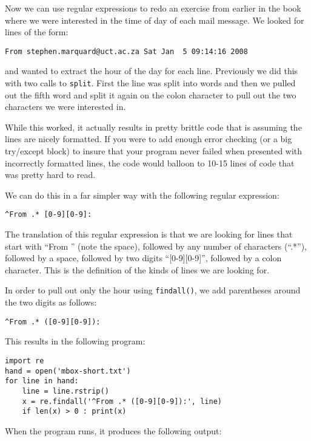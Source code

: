 Now we can use regular expressions to redo an exercise from earlier in the book where we were
interested in the time of day of each mail message.   We looked for lines of the form:

\beforeverb
\begin{verbatim}
From stephen.marquard@uct.ac.za Sat Jan  5 09:14:16 2008
\end{verbatim}
\afterverb
%
and wanted to extract the hour of the day for each line.  Previously we did this with two calls
to {\tt split}.  First the line was split into words and then we pulled out the fifth word and split
it again on the colon character to pull out the two characters we were interested in.

While this worked, it actually results in pretty brittle code that is assuming the lines are nicely
formatted.  If you were to add enough error checking (or a big try/except block) to insure that your
program never failed when presented with incorrectly formatted lines, the code would balloon to 
10-15 lines of code that was pretty hard to read.

We can do this in a far simpler way with the following regular expression:

\beforeverb
\begin{verbatim}
^From .* [0-9][0-9]:
\end{verbatim}
\afterverb
%
The translation of this regular expression is that we are looking for lines that start with ``From ''
(note the space), followed by any number of characters (``.*''), followed by a space, followed by two
digits ``[0-9][0-9]'', followed by a colon character.  This is the definition of the kinds of lines
we are looking for.  

In order to pull out only the hour using {\tt findall()}, we add parentheses around the two digits
as follows:

\beforeverb
\begin{verbatim}
^From .* ([0-9][0-9]):
\end{verbatim}
\afterverb
%
This results in the following program:

\beforeverb
\begin{verbatim}
import re
hand = open('mbox-short.txt')
for line in hand:
    line = line.rstrip()
    x = re.findall('^From .* ([0-9][0-9]):', line)
    if len(x) > 0 : print(x)
\end{verbatim}
\afterverb
%
When the program runs, it produces the following output:

